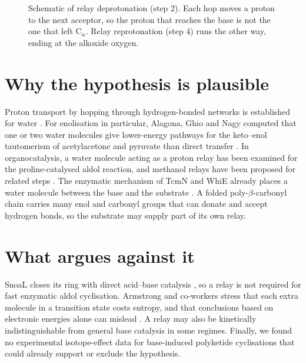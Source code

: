 \documentclass[11pt]{article}
\begin{document}
\begin{figure}[t]\centering
{}
\caption{Schematic of relay deprotonation (step 2). Each hop moves a proton to the next acceptor, so the proton that reaches the base is not the one that left C$_\alpha$. Relay reprotonation (step 4) runs the other way, ending at the alkoxide oxygen.}\label{fig:relay}
\end{figure}

\section{Why the hypothesis is plausible}
Proton transport by hopping through hydrogen-bonded networks is established for water \cite{agmon1995,marx1999}. For enolisation in particular, Alagona, Ghio and Nagy computed that one or two water molecules give lower-energy pathways for the keto--enol tautomerism of acetylacetone and pyruvate than direct transfer \cite{alagona2010}. In organocatalysis, a water molecule acting as a proton relay has been examined for the proline-catalysed aldol reaction, and methanol relays have been proposed for related steps \cite{armstrong2014}. The enzymatic mechanism of TcmN and WhiE already places a water molecule between the base and the substrate \cite{ames2008,lee2012}. A folded poly-$\beta$-carbonyl chain carries many enol and carbonyl groups that can donate and accept hydrogen bonds, so the substrate may supply part of its own relay.

\section{What argues against it}
SnoaL closes its ring with direct acid--base catalysis \cite{sultana2004}, so a relay is not required for fast enzymatic aldol cyclisation. Armstrong and co-workers stress that each extra molecule in a transition state costs entropy, and that conclusions based on electronic energies alone can mislead \cite{armstrong2014}. A relay may also be kinetically indistinguishable from general base catalysis in some regimes. Finally, we found no experimental isotope-effect data for base-induced polyketide cyclisations that could already support or exclude the hypothesis.
\end{document}

